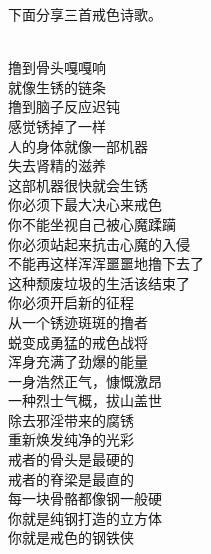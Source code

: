 下面分享三首戒色诗歌。

\begin{poem}[戒色除锈行动]
    \begin{multicols}{2}
        \centering~\\
        撸到骨头嘎嘎响 \\ 就像生锈的链条 \\ 撸到脑子反应迟钝 \\ 感觉锈掉了一样 \\ 人的身体就像一部机器 \\ 失去肾精的滋养 \\ 这部机器很快就会生锈 \\ 你必须下最大决心来戒色 \\ 你不能坐视自己被心魔蹂躏 \\ 你必须站起来抗击心魔的入侵 \\ 不能再这样浑浑噩噩地撸下去了 \\ 这种颓废垃圾的生活该结束了 \\ 你必须开启新的征程 \\ 从一个锈迹斑斑的撸者 \\ 蜕变成勇猛的戒色战将 \\ 浑身充满了劲爆的能量 \\ 一身浩然正气，慷慨激昂 \\ 一种烈士气概，拔山盖世 \\ 除去邪淫带来的腐锈 \\ 重新焕发纯净的光彩 \\ 戒者的骨头是最硬的 \\ 戒者的脊梁是最直的 \\ 每一块骨骼都像钢一般硬 \\ 你就是纯钢打造的立方体 \\ 你就是戒色的钢铁侠
    \end{multicols}
\end{poem}

